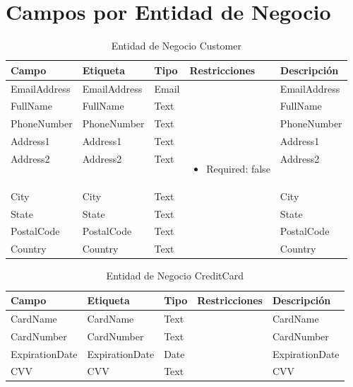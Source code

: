 \section{Campos por Entidad de Negocio} \label{sec:entity-fields-customer}

\begin{table}[H]
	\caption{Entidad de Negocio Customer}
	\label{tab:fields-dom-Customer}
	\begin{center}
	\begin{tabularx}{0.90\linewidth}{ X X X X X }
		\hline
		\textbf{Campo} &
		\textbf{Etiqueta} &
		\textbf{Tipo} &
		\textbf{Restricciones} &
		\textbf{Descripci\'on} \\
		\hline
		EmailAddress &
		EmailAddress &
		Email &
		 &
		EmailAddress \\
		FullName &
		FullName &
		Text &
		 &
		FullName \\
		PhoneNumber &
		PhoneNumber &
		Text &
		 &
		PhoneNumber \\
		Address1 &
		Address1 &
		Text &
		 &
		Address1 \\
		Address2 &
		Address2 &
		Text &
		\begin{minipage}[t]{0.2\textwidth}
		\begin{itemize}[noitemsep,nolistsep]
		\setlength{\itemindent}{-.5cm}
		\item Required: false
		\end{itemize}
		\end{minipage}
		 &
		Address2 \\
		City &
		City &
		Text &
		 &
		City \\
		State &
		State &
		Text &
		 &
		State \\
		PostalCode &
		PostalCode &
		Text &
		 &
		PostalCode \\
		Country &
		Country &
		Text &
		 &
		Country \\
		\hline
	\end{tabularx}
	\end{center}
\end{table}
\begin{table}[H]
	\caption{Entidad de Negocio CreditCard}
	\label{tab:fields-dom-CreditCard}
	\begin{center}
	\begin{tabularx}{0.90\linewidth}{ X X X X X }
		\hline
		\textbf{Campo} &
		\textbf{Etiqueta} &
		\textbf{Tipo} &
		\textbf{Restricciones} &
		\textbf{Descripci\'on} \\
		\hline
		CardName &
		CardName &
		Text &
		 &
		CardName \\
		CardNumber &
		CardNumber &
		Text &
		 &
		CardNumber \\
		ExpirationDate &
		ExpirationDate &
		Date &
		 &
		ExpirationDate \\
		CVV &
		CVV &
		Text &
		 &
		CVV \\
		\hline
	\end{tabularx}
	\end{center}
\end{table}
